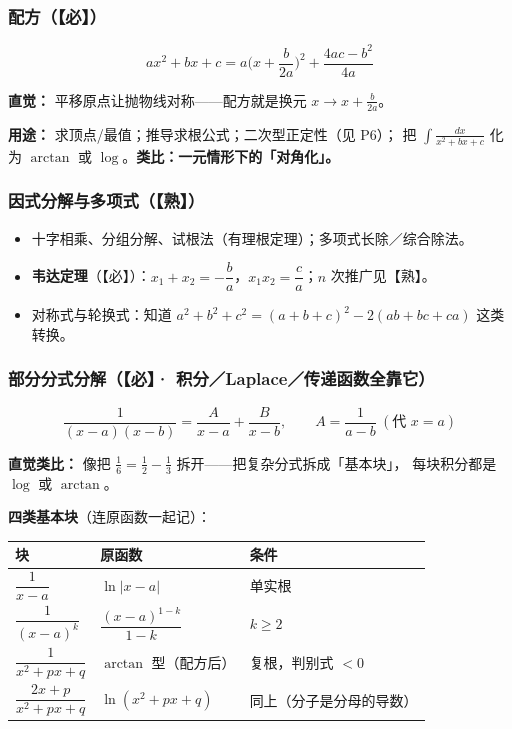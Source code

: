 \subsubsection{配方（【必】）}

\[
ax^2+bx+c=a\Big(x+\frac{b}{2a}\Big)^2+\frac{4ac-b^2}{4a}
\]

\textbf{直觉：} 平移原点让抛物线对称——配方就是换元 $x\to x+\frac{b}{2a}$。

\textbf{用途：} 求顶点/最值；推导求根公式；二次型正定性（见 P6）；
把 $\int\frac{dx}{x^2+bx+c}$ 化为 $\arctan$ 或 $\log$。\textbf{类比：一元情形下的「对角化」。}

\subsubsection{因式分解与多项式（【熟】）}

\begin{itemize}
  \item 十字相乘、分组分解、试根法（有理根定理）；多项式长除／综合除法。
  \item \textbf{韦达定理}（【必】）：$x_1+x_2=-\dfrac ba$，$x_1x_2=\dfrac ca$；$n$ 次推广见【熟】。
  \item 对称式与轮换式：知道 $a^2+b^2+c^2=(a+b+c)^2-2(ab+bc+ca)$ 这类转换。
\end{itemize}

\subsubsection{部分分式分解（【必】· 积分／Laplace／传递函数全靠它）}

\[
\frac{1}{(x-a)(x-b)}=\frac{A}{x-a}+\frac{B}{x-b},\qquad A=\frac{1}{a-b}\ (\text{代 }x=a)
\]

\textbf{直觉类比：} 像把 $\frac16=\frac12-\frac13$ 拆开——把复杂分式拆成「基本块」，
每块积分都是 $\log$ 或 $\arctan$。

\textbf{四类基本块}（连原函数一起记）：

\begin{center}
\begin{tabular}{lll}
\toprule
\textbf{块} & \textbf{原函数} & \textbf{条件} \\
\midrule
$\dfrac{1}{x-a}$ & $\ln|x-a|$ & 单实根 \\
$\dfrac{1}{(x-a)^k}$ & $\dfrac{(x-a)^{1-k}}{1-k}$ & $k\ge2$ \\
$\dfrac{1}{x^2+px+q}$ & $\arctan$ 型（配方后） & 复根，判别式 $<0$ \\
$\dfrac{2x+p}{x^2+px+q}$ & $\ln(x^2+px+q)$ & 同上（分子是分母的导数） \\
\bottomrule
\end{tabular}
\end{center}


